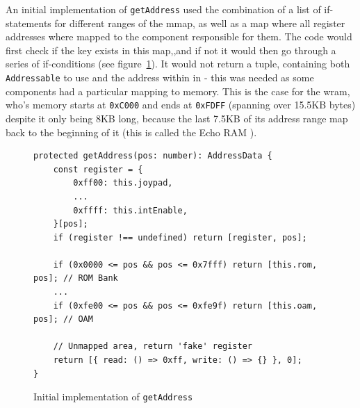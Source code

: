\documentclass[11pt]{report}
\begin{document}
An initial implementation of \texttt{getAddress} used the combination of a list of if-statements for different ranges of the \gls{mmap}, as well as a map where all register addresses where mapped to the component responsible for them. The code would first check if the key exists in this map,,and if not it would then go through a series of if-conditions  (see figure~\ref{fig:getaddress-before}). It would not return a tuple, containing both \texttt{Addressable} to use and the address within in - this was needed as some components had a particular mapping to memory. This is the case for the \gls{wram}, who's memory starts at \texttt{0xC000} and ends at \texttt{0xFDFF} (spanning over 15.5KB bytes) despite it only being 8KB long, because the last 7.5KB of its address range map back to the beginning of it (this is called the Echo RAM \cite{memorymap}).

\begin{figure}[h]
    \begin{verbatim}
protected getAddress(pos: number): AddressData {
    const register = {
        0xff00: this.joypad,
        ...
        0xffff: this.intEnable,
    }[pos];
    if (register !== undefined) return [register, pos];

    if (0x0000 <= pos && pos <= 0x7fff) return [this.rom, pos]; // ROM Bank
    ...
    if (0xfe00 <= pos && pos <= 0xfe9f) return [this.oam, pos]; // OAM

    // Unmapped area, return 'fake' register
    return [{ read: () => 0xff, write: () => {} }, 0];
}
    \end{verbatim}
    \caption{Initial implementation of \texttt{getAddress}}
    \label{fig:getaddress-before}
\end{figure}
\end{document}
